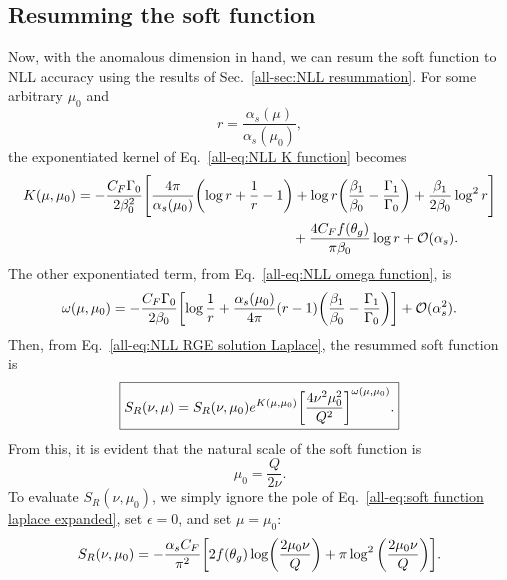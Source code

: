 \documentclass[../thesis.tex]{subfiles}
\providecommand{\cO}{\mathcal{O}}
\begin{document}
\subsection{Resumming the soft function}
	Now, with the anomalous dimension in hand, we can resum the soft function to NLL accuracy using the results of Sec.~\ref{all-sec:NLL resummation}. For some arbitrary $\mu_0$ and
	\begin{equation}
		r = \frac{\alpha_s (\mu)}{\alpha_s (\mu_0)},
	\end{equation}
	the exponentiated kernel of Eq.~\ref{all-eq:NLL K function} becomes
	\begin{equation}
	\begin{aligned}
		K(\mu, \mu_0) = -\frac{C_F \Gamma_0}{2\beta_0^2}\Bigg[\frac{4\pi}{\alpha_s(\mu_0)} \qty(\log r + \frac{1}{r} - 1) + \log r \qty(\frac{\beta_1}{\beta_0} - \frac{\Gamma_1}{\Gamma_0}) &+ \frac{\beta_1}{2\beta_0}\log^2 r \Bigg] \\
		&\hspace{-3cm}+ \frac{4 C_F f(\theta_g)}{\pi \beta_0} \log r + \cO(\alpha_s).
	\end{aligned}
	\end{equation}
	The other exponentiated term, from Eq.~\ref{all-eq:NLL omega function}, is
	\begin{equation}
	\begin{aligned}
		\omega(\mu, \mu_0) = -\frac{C_F \Gamma_0}{2\beta_0}\qty[\log \frac{1}{r} + \frac{\alpha_s(\mu_0)}{4\pi}(r - 1)\qty(\frac{\beta_1}{\beta_0} - \frac{\Gamma_1}{\Gamma_0})] + \cO(\alpha_s^2).
	\end{aligned}
	\end{equation}
	Then, from Eq.~\ref{all-eq:NLL RGE solution Laplace}, the resummed soft function is
	\begin{equation}\label{all-eq:NLL soft function Laplace}
	\boxed{
		S_R(\nu, \mu) = S_R(\nu, \mu_0) e^{K(\mu, \mu_0)} \qty[\frac{4\nu^2\mu_0^2}{Q^2}]^{\omega(\mu, \mu_0)}.
	}
	\end{equation}
	From this, it is evident that the natural scale of the soft function is
	\begin{equation}
		\mu_0 = \frac{Q}{2\nu}.
	\end{equation}
	To evaluate $S_R(\nu, \mu_0)$, we simply ignore the pole of Eq.~\ref{all-eq:soft function laplace expanded}, set $\epsilon = 0$, and set $\mu = \mu_0$:
	\begin{equation}
		S_R(\nu, \mu_0) = -\frac{\alpha_s C_F}{\pi^2}\qty[2f(\theta_g)\log(\frac{2\mu_0 \nu}{Q}) + \pi \log^2\qty(\frac{2\mu_0 \nu}{Q})].
	\end{equation}
\end{document}
